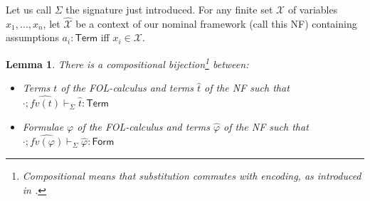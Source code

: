 \documentclass[copyright,creativecommons]{eptcs}
\newtheorem{lemma}{Lemma}
\newcounter{s}
\newcommand{\typing}[2]{\ensuremath{#1 : #2}}
\newcommand{\emptyCtx}{\cdot}
\newcommand{\tyjdgmntsig}[6]{\ensuremath{#1;#2\vdash_{#4} \typing{#5}{#6}}}
\begin{document}
 Let us call $\Sigma$ the signature just introduced.
For any finite set $\mathcal{X}$ of variables $x_1, \ldots, x_n$, let $\hat{\mathcal{X}}$ be a context of our nominal framework (call this NF) containing assumptions $a_i : \mathsf{Term}$ iff $x_i \in \mathcal{X}$.

\noindent
\begin{lemma}\label{LAdeq:FOL}
There is a compositional bijection\footnote{Compositional means that substitution commutes with encoding, as introduced in \cite{harper:fradl}.} between:
\begin{itemize}
    \item Terms $t$ of the FOL-calculus and terms $\hat{t}$ of the NF such that $\tyjdgmntsig{\emptyCtx}{\widehat{fv(t)}}{\emptyCtx}{\Sigma}{\hat{t}}{\mathsf{Term}}{}$
    \item Formulae $\varphi$ of the FOL-calculus and terms $\hat{\varphi}$ of the NF such that $\tyjdgmntsig{\emptyCtx}{\widehat{fv(\varphi)}}{\emptyCtx}{\Sigma}{\hat{\varphi}}{\mathsf{Form}}{}$
\end{itemize}
\end{lemma}
\end{document}
